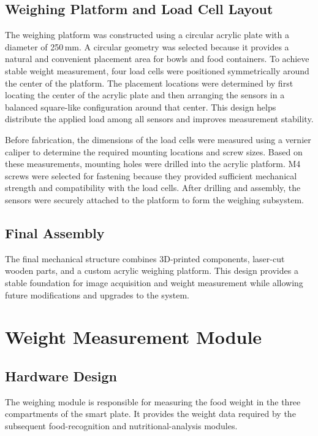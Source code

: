 \documentclass[11pt,a4paper]{article}
\begin{document}
\subsection{Weighing Platform and Load Cell Layout}

The weighing platform was constructed using a circular acrylic plate with a diameter of 250\,mm. A circular geometry was selected because it provides a natural and convenient placement area for bowls and food containers. To achieve stable weight measurement, four load cells were positioned symmetrically around the center of the platform. The placement locations were determined by first locating the center of the acrylic plate and then arranging the sensors in a balanced square-like configuration around that center. This design helps distribute the applied load among all sensors and improves measurement stability.

Before fabrication, the dimensions of the load cells were measured using a vernier caliper to determine the required mounting locations and screw sizes. Based on these measurements, mounting holes were drilled into the acrylic platform. M4 screws were selected for fastening because they provided sufficient mechanical strength and compatibility with the load cells. After drilling and assembly, the sensors were securely attached to the platform to form the weighing subsystem.

\subsection{Final Assembly}

The final mechanical structure combines 3D-printed components, laser-cut wooden parts, and a custom acrylic weighing platform. This design provides a stable foundation for image acquisition and weight measurement while allowing future modifications and upgrades to the system.

\section{Weight Measurement Module}

\subsection{Hardware Design}

The weighing module is responsible for measuring the food weight in the three compartments of the smart plate. It provides the weight data required by the subsequent food-recognition and nutritional-analysis modules.
\end{document}
